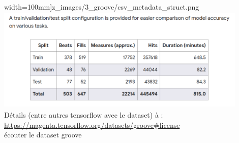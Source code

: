 	width=100mm]{z_images/3_groove/csv_metadata_struct.png}\\
	\includegraphics[height=50mm, width=120mm]{z_images/3_groove/train_validation_test.png}\\
	Détails (entre autres tensorflow avec le dataset) à :
	\url{https://magenta.tensorflow.org/datasets/groove#license}\\
	écouter le dataset groove
	\newpage